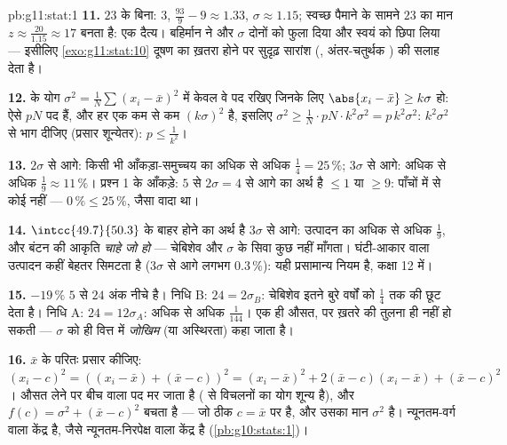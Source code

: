 \begin{solution}{pb:g11:stat:1}
\textbf{11.} $23$ के बिना:  $3$,  $\frac{93}{9} - 9 \approx 1.33$, $\sigma \approx 1.15$; स्वच्छ पैमाने
के सामने $23$ का मान $z \approx \frac{20}{1.15} \approx 17$ बनता है: एक दैत्य। बहिर्मान ने  और $\sigma$
दोनों को फुला दिया और स्वयं को छिपा लिया --- इसीलिए \cref{exo:g11:stat:10} दूषण का ख़तरा होने
पर सुदृढ़ सारांश (, अंतर-चतुर्थक ) की सलाह देता है।

\textbf{12.}  के योग $\sigma^2 = \frac1N \sum (x_i - \bar x)^2$ में केवल वे पद रखिए जिनके लिए $\abs{x_i - \bar x} \geq k\sigma$ हो:
ऐसे $pN$ पद हैं, और हर एक कम से कम $(k\sigma)^2$ है, इसलिए $\sigma^2 \geq \frac{1}{N} \cdot pN \cdot k^2\sigma^2 =
p\,k^2\sigma^2$: $k^2 \sigma^2$ से भाग
दीजिए (प्रसार शून्येतर): $p \leq \frac{1}{k^2}$।

\textbf{13.} $2\sigma$ से आगे: किसी भी आँकड़ा-समुच्चय का अधिक से अधिक $\frac14 = 25\,\%$;
$3\sigma$ से आगे: अधिक से अधिक $\frac19 \approx 11\,\%$। प्रश्न 1 के आँकड़े:  $5$ से $2\sigma = 4$
से आगे का अर्थ है $\leq 1$ या $\geq 9$: पाँचों में से कोई नहीं --- $0\,\% \leq 25\,\%$, जैसा
वादा था।

\textbf{14.} $\intcc{49.7}{50.3}$ के बाहर होने का अर्थ है $3\sigma$ से आगे: उत्पादन का अधिक से
अधिक $\frac19$, और बंटन की आकृति \emph{चाहे जो हो} --- चेबिशेव  और $\sigma$ के
सिवा कुछ नहीं माँगता। घंटी-आकार वाला उत्पादन कहीं बेहतर सिमटता है ($3\sigma$ से
आगे लगभग $0.3\,\%$): यही प्रसामान्य नियम है, कक्षा 12 में।

\textbf{15.} $-19\,\%$  $5$ से $24$ अंक नीचे है। निधि B: $24 = 2\sigma_B$: चेबिशेव
इतने बुरे वर्षों को $\frac14$ तक की छूट देता है। निधि A: $24 = 12\sigma_A$: अधिक से अधिक
$\frac{1}{144}$। एक ही औसत, पर ख़तरे की तुलना ही नहीं हो सकती --- $\sigma$ को ही वित्त
में \emph{जोखिम} (या अस्थिरता) कहा जाता है।

\textbf{16.} $\bar x$ के परितः प्रसार कीजिए: $(x_i - c)^2 = \left((x_i - \bar x) + (\bar x - c)\right)^2
= (x_i - \bar x)^2 + 2(\bar x - c)(x_i - \bar x) +
(\bar x - c)^2$। औसत लेने पर बीच वाला पद मर
जाता है ( से विचलनों का योग शून्य है), और $f(c) = \sigma^2 + (\bar x - c)^2$ बचता है --- जो ठीक $c = \bar x$
पर  है, और उसका  मान $\sigma^2$ है।  न्यूनतम-वर्ग वाला केंद्र
है, जैसे  न्यूनतम-निरपेक्ष वाला केंद्र है (\cref{pb:g10:stats:1})।


\end{solution}
